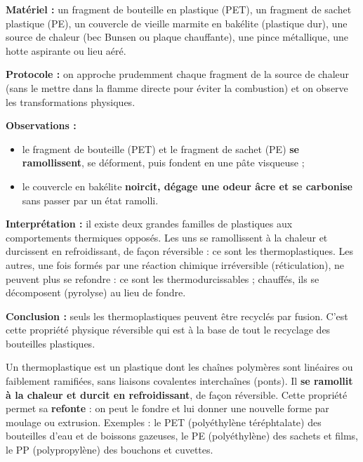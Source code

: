 \documentclass[11pt]{article}
\newcommand{\cle}[1]{{\popxbold\color{popdark}#1}}
\begin{document}
\begin{experience}
\textbf{Matériel :} un fragment de bouteille en plastique (PET), un fragment de sachet plastique (PE), un couvercle de vieille marmite en bakélite (plastique dur), une source de chaleur (bec Bunsen ou plaque chauffante), une pince métallique, une hotte aspirante ou lieu aéré.

\textbf{Protocole :} on approche prudemment chaque fragment de la source de chaleur (sans le mettre dans la flamme directe pour éviter la combustion) et on observe les transformations physiques.

\textbf{Observations :}
\begin{itemize}
\item le fragment de bouteille (PET) et le fragment de sachet (PE) \textbf{se ramollissent}, se déforment, puis fondent en une pâte visqueuse ;
\item le couvercle en bakélite \textbf{noircit, dégage une odeur âcre et se carbonise} sans passer par un état ramolli.
\end{itemize}

\textbf{Interprétation :} il existe deux grandes familles de plastiques aux comportements thermiques opposés. Les uns se ramollissent à la chaleur et durcissent en refroidissant, de façon réversible : ce sont les \cle{thermoplastiques}. Les autres, une fois formés par une réaction chimique irréversible (réticulation), ne peuvent plus se refondre : ce sont les \cle{thermodurcissables} ; chauffés, ils se décomposent (pyrolyse) au lieu de fondre.

\textbf{Conclusion :} seuls les thermoplastiques peuvent être recyclés par fusion. C'est cette propriété physique réversible qui est à la base de tout le recyclage des bouteilles plastiques.
\end{experience}

\begin{definition}
Un \cle{thermoplastique} est un plastique dont les chaînes polymères sont linéaires ou faiblement ramifiées, sans liaisons covalentes interchaînes (ponts). Il \textbf{se ramollit à la chaleur et durcit en refroidissant}, de façon réversible. Cette propriété permet sa \textbf{refonte} : on peut le fondre et lui donner une nouvelle forme par moulage ou extrusion. Exemples : le \cle{PET} (polyéthylène téréphtalate) des bouteilles d'eau et de boissons gazeuses, le PE (polyéthylène) des sachets et films, le PP (polypropylène) des bouchons et cuvettes.
\end{definition}
\end{document}
